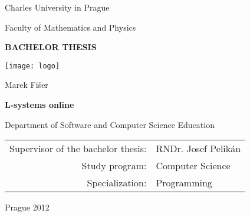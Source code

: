 
\pagestyle{empty}
\begin{center}

\large

Charles University in Prague

\medskip

Faculty of Mathematics and Physics

\vfill

{\bf\Large BACHELOR THESIS}

\vfill

\centerline{\mbox{\texttt{[image: logo]}}}

\vfill
\vspace{5mm}

{\LARGE Marek Fišer}

\vspace{15mm}

{\LARGE\bfseries L-systems online}

\vfill

Department of Software and Computer Science Education

\vfill

\begin{tabular}{rl}

Supervisor of the bachelor thesis: & RNDr. Josef Pelikán \\
\noalign{\vspace{2mm}}
Study program: & Computer Science \\
\noalign{\vspace{2mm}}
Specialization: & Programming \\
\end{tabular}

\vfill

Prague 2012

\end{center}




































